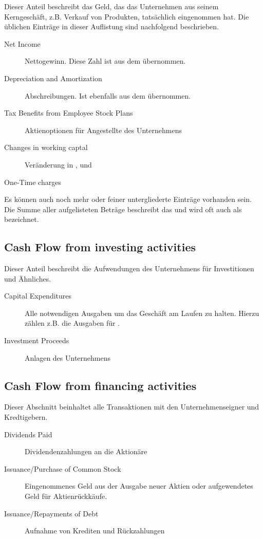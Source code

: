 Dieser Anteil beschreibt das Geld, das das Unternehmen aus seinem Kerngeschäft, z.B. Verkauf von Produkten, tatsächlich eingenommen hat.
Die üblichen Einträge in dieser Auflistung sind nachfolgend beschrieben.
\begin{description}
    \item[Net Income] Nettogewinn. Diese Zahl ist aus dem  übernommen.
    \item[Depreciation and Amortization] Abschreibungen. Ist ebenfalls aus dem  übernommen.
    \item[Tax Benefits from Employee Stock Plans] Aktienoptionen für Angestellte des Unternehmens
    \item[Changes in working captal] Veränderung in ,  und 
    \item[One-Time charges]   
\end{description}

Es können auch noch mehr oder feiner untergliederte Einträge vorhanden sein.
Die Summe aller aufgelisteten Beträge beschreibt das \textbf{} und wird oft auch als  bezeichnet.

%
\subsection{Cash Flow from investing activities}

Dieser Anteil beschreibt die Aufwendungen des Unternehmens für Investitionen und Ähnliches.
\begin{description}
    \item[Capital Expenditures] Alle notwendigen Ausgaben um das Geschäft am Laufen zu halten. 
        Hierzu zählen z.B. die Ausgaben für .
    \item[Investment Proceeds] Anlagen des Unternehmens  
\end{description}

%
\subsection{Cash Flow from financing activities}

Dieser Abschnitt beinhaltet alle Transaktionen mit den Unternehmenseigner und Kredtigebern.
\begin{description}
    \item[Dividends Paid] Dividendenzahlungen an die Aktionäre
    \item[Issuance/Purchase of Common Stock] Eingenommenes Geld aus der Ausgabe neuer Aktien oder aufgewendetes Geld für Aktienrückkäufe.
    \item[Issuance/Repayments of Debt] Aufnahme von Krediten und Rückzahlungen  
\end{description}
